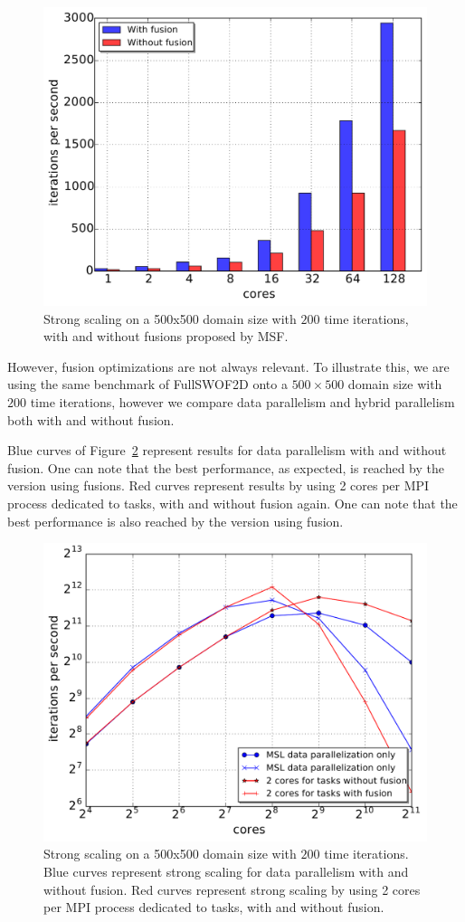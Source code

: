 \begin{figure}[!h]\begin{center}
  \includegraphics[width=.6\textwidth]{../results/task_scaling/500_200/fusVSbase.pdf}
  \caption{Strong scaling on a 500x500 domain size with $200$ time iterations, with and without fusions proposed by MSF.}
  \label{fig:fusion}
\end{center}\end{figure}

However, fusion optimizations are not always relevant. To illustrate this, we are using the same benchmark of FullSWOF2D onto a $500 \times 500$ domain size with $200$ time iterations, however we compare data parallelism and hybrid parallelism both with and without fusion. 

Blue curves of Figure~\ref{fig:fusion1} represent results for data parallelism with and without fusion. One can note that the best performance, as expected, is reached by the version using fusions. Red curves represent results by using 2 cores per MPI process dedicated to tasks, with and without fusion again. One can note that the best performance is also reached by the version using fusion.

\begin{figure}[!h]\begin{center}
  \includegraphics[width=.6\textwidth]{../results/task_scaling/500_200/withwithout2_close_median.pdf}
  \caption{Strong scaling on a 500x500 domain size with $200$ time iterations. Blue curves represent strong scaling for data parallelism with and without fusion. Red curves represent strong scaling by using 2 cores per MPI process dedicated to tasks, with and without fusion.}
  \label{fig:fusion1}
\end{center}\end{figure}

